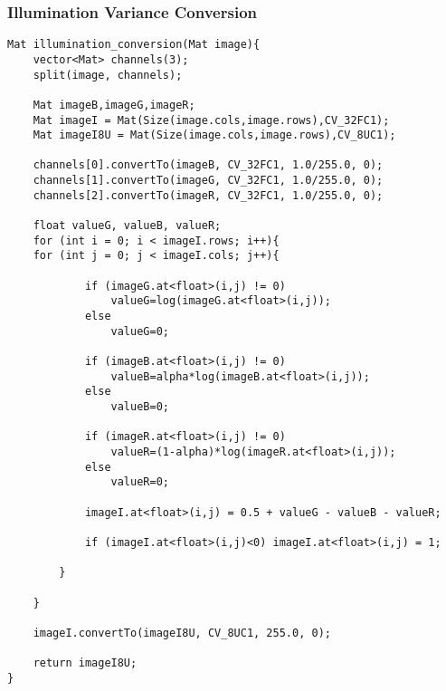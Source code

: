 \subsubsection{Illumination Variance Conversion}

\begin{lstlisting}[style=CStyle]
Mat illumination_conversion(Mat image){
	vector<Mat> channels(3);
	split(image, channels);
	
	Mat imageB,imageG,imageR;
	Mat imageI = Mat(Size(image.cols,image.rows),CV_32FC1);
	Mat imageI8U = Mat(Size(image.cols,image.rows),CV_8UC1);
	
	channels[0].convertTo(imageB, CV_32FC1, 1.0/255.0, 0);
	channels[1].convertTo(imageG, CV_32FC1, 1.0/255.0, 0);
	channels[2].convertTo(imageR, CV_32FC1, 1.0/255.0, 0);
	
	float valueG, valueB, valueR;
	for (int i = 0; i < imageI.rows; i++){
	for (int j = 0; j < imageI.cols; j++){
	
			if (imageG.at<float>(i,j) != 0)
				valueG=log(imageG.at<float>(i,j));
			else
				valueG=0;
			
			if (imageB.at<float>(i,j) != 0)
				valueB=alpha*log(imageB.at<float>(i,j));
			else
				valueB=0;
			
			if (imageR.at<float>(i,j) != 0)
				valueR=(1-alpha)*log(imageR.at<float>(i,j));
			else
				valueR=0;
			
			imageI.at<float>(i,j) = 0.5 + valueG - valueB - valueR;
			
			if (imageI.at<float>(i,j)<0) imageI.at<float>(i,j) = 1;
			
		}
	
	}
	
	imageI.convertTo(imageI8U, CV_8UC1, 255.0, 0);
	
	return imageI8U;
}
\end{lstlisting}



\newpage
